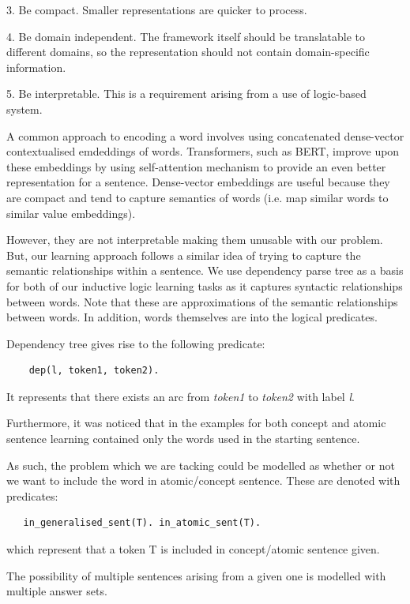 3. Be compact. Smaller representations are quicker to process. 

4. Be domain independent. The framework itself should be translatable to different domains, so the representation should not contain domain-specific information.

5. Be interpretable. This is a requirement arising from a use of logic-based system.


A common approach to encoding a word involves using concatenated dense-vector contextualised emdeddings of words. 
Transformers, such as BERT, improve upon these embeddings by using self-attention mechanism to provide an even better representation for a sentence.
Dense-vector embeddings are useful because they are compact and tend to capture semantics of words (i.e. map similar words to similar value embeddings).

However, they are not interpretable making them unusable with our problem. 
But, our learning approach follows a similar idea of trying to capture the semantic relationships within a sentence.
We use dependency parse tree as a basis for both of our inductive logic learning tasks as it captures syntactic relationships between words.
Note that these are approximations of the semantic relationships between words.
In addition, words themselves are into the logical predicates.

Dependency tree gives rise to the following predicate:
\begin{verbatim}
    dep(l, token1, token2).
\end{verbatim}

It represents that there exists an arc from \textit{token1} to \textit{token2} with label \textit{l}.

Furthermore, it was noticed that in the examples for both concept and atomic sentence learning contained only the words used in the starting sentence.

As such, the problem which we are tacking could be modelled as whether or not we want to include the word in atomic/concept sentence.
These are denoted with predicates:
\begin{verbatim}
   in_generalised_sent(T). in_atomic_sent(T). 
\end{verbatim}
which represent that a token T is included in concept/atomic sentence given.

The possibility of multiple sentences arising from a given one is modelled with multiple answer sets. 



